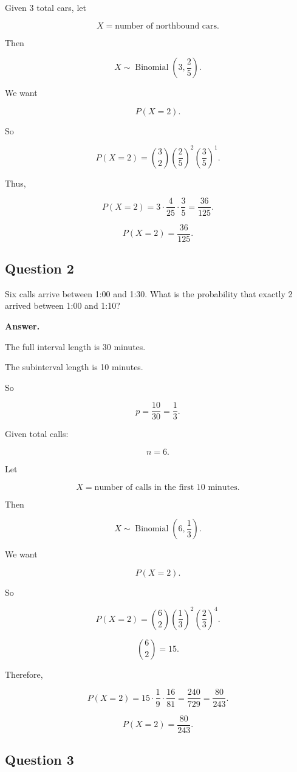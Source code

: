 \documentclass[12pt]{article}
\begin{document}
Given 3 total cars, let

\[
X=\text{number of northbound cars}.
\]

Then

\[
X\sim \operatorname{Binomial}\left(3,\frac{2}{5}\right).
\]

We want

\[
P(X=2).
\]

So

\[
P(X=2)=\binom{3}{2}
\left(\frac{2}{5}\right)^2
\left(\frac{3}{5}\right)^1.
\]

Thus,

\[
P(X=2)=3\cdot \frac{4}{25}\cdot \frac{3}{5}
=\frac{36}{125}.
\]

\[
\boxed{P(X=2)=\frac{36}{125}.}
\]

\subsection*{Question 2}

Six calls arrive between 1:00 and 1:30. What is the probability that exactly 2 arrived between 1:00 and 1:10?

\textbf{Answer.}

The full interval length is 30 minutes.

The subinterval length is 10 minutes.

So

\[
p=\frac{10}{30}=\frac{1}{3}.
\]

Given total calls:

\[
n=6.
\]

Let

\[
X=\text{number of calls in the first 10 minutes}.
\]

Then

\[
X\sim \operatorname{Binomial}\left(6,\frac{1}{3}\right).
\]

We want

\[
P(X=2).
\]

So

\[
P(X=2)=\binom{6}{2}
\left(\frac{1}{3}\right)^2
\left(\frac{2}{3}\right)^4.
\]

\[
\binom{6}{2}=15.
\]

Therefore,

\[
P(X=2)=15\cdot \frac{1}{9}\cdot \frac{16}{81}
=\frac{240}{729}
=\frac{80}{243}.
\]

\[
\boxed{P(X=2)=\frac{80}{243}.}
\]

\subsection*{Question 3}
\end{document}
